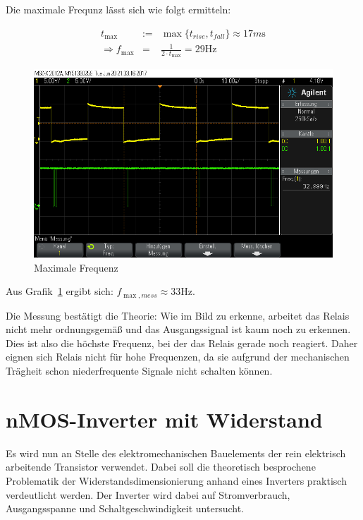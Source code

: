 \documentclass[10pt]{scrreprt}
\begin{document}
    Die maximale Frequnz lässt sich wie folgt ermitteln:

    \begin{eqnarray*}
        t_{\max} &:=& \max \{ t_{rise}, t_{fall} \} \approx 17\si{m\second}\\
        \Rightarrow f_{\max} &=& \frac{1}{2 \cdot t_{\max} } = 29\si{\hertz}
    \end{eqnarray*}

    \begin{figure}[H]
        \centering
        \includegraphics[width=\textwidth]{scope_2.png}
        \caption{Maximale Frequenz}
        \label{fig:MaxFreqRelais}
    \end{figure}

    Aus Grafik~\ref{fig:MaxFreqRelais} ergibt sich: $f_{\max,mess} \approx 33\si{\hertz}$.

    Die Messung bestätigt die Theorie: Wie im Bild zu erkenne, arbeitet das Relais nicht
    mehr ordnungsgemäß und das Ausgangssignal ist kaum noch zu erkennen. Dies ist
    also die höchste Frequenz, bei der das Relais gerade noch reagiert.
    Daher eignen sich Relais nicht für hohe Frequenzen, da sie aufgrund der mechanischen
    Trägheit schon niederfrequente Signale nicht schalten können.

    \section{nMOS-Inverter mit Widerstand}
    Es wird nun an Stelle des elektromechanischen Bauelements der rein elektrisch
    arbeitende Transistor verwendet. Dabei soll die theoretisch besprochene Problematik der
    Widerstandsdimensionierung anhand eines Inverters praktisch verdeutlicht werden. Der Inverter
    wird dabei auf Stromverbrauch, Ausgangsspanne und Schaltgeschwindigkeit untersucht.
\end{document}
